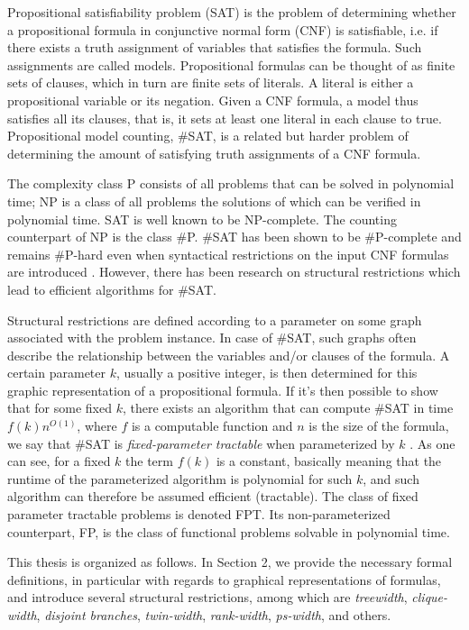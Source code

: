 Propositional satisfiability problem (SAT) is the problem of determining whether a propositional formula in conjunctive normal form (CNF) is satisfiable, i.e. if there exists a truth assignment of variables that satisfies the formula.
Such assignments are called models.
Propositional formulas can be thought of as finite sets of clauses, which in turn are finite sets of literals.
A literal is either a propositional variable or its negation.
Given a CNF formula, a model thus satisfies all its clauses, that is, it sets at least one literal in each clause to true.
Propositional model counting, \#SAT, is a related but harder problem of determining the amount of satisfying truth assignments of a CNF formula.

The complexity class P consists of all problems that can be solved in polynomial time; NP is a class of all problems the solutions of which can be verified in polynomial time. SAT is well known to be NP-complete.
The counting counterpart of NP is the class \#P.
\#SAT has been shown to be \#P-complete and remains \#P-hard even when syntactical restrictions on the input CNF formulas are introduced \cite{DBLP:conf/sat/GanianS17}.
However, there has been research on structural restrictions \cite{DBLP:conf/sat/GanianS17, DBLP:conf/sat/CapelliDM14, DBLP:conf/sat/GanianPSSS22, DBLP:conf/sat/SaetherTV14, DBLP:journals/dam/FischerMR08, DBLP:journals/jda/SamerS10, DBLP:journals/fuin/GanianHO13} which lead to efficient algorithms for \#SAT.

Structural restrictions are defined according to a parameter on some graph associated with the problem instance.
In case of \#SAT, such graphs often describe the relationship between the variables and/or clauses of the formula.
A certain parameter $k$, usually a positive integer, is then determined for this graphic representation of a propositional formula. 
If it's then possible to show that for some fixed $k$, there exists an algorithm that can compute \#SAT in time $f(k)n^{O(1)}$, where $f$ is a computable function and $n$ is the size of the formula, we say that \#SAT is {\em fixed-parameter tractable} when parameterized by $k$ \cite{DBLP:conf/sat/GanianS17}.
As one can see, for a fixed $k$ the term $f(k)$ is a constant, basically meaning that the runtime of the parameterized algorithm is polynomial for such $k$, and such algorithm can therefore be assumed efficient (tractable). The class of fixed parameter tractable problems is denoted FPT.
Its non-parameterized counterpart, FP, is the class of functional problems solvable in polynomial time.

This thesis is organized as follows.
In Section 2, we provide the necessary formal definitions, in particular with regards to graphical representations of formulas, and introduce several structural restrictions, among which are {\em treewidth}, {\em clique-width}, {\em disjoint branches}, {\em twin-width}, {\em rank-width}, {\em ps-width}, and others.
